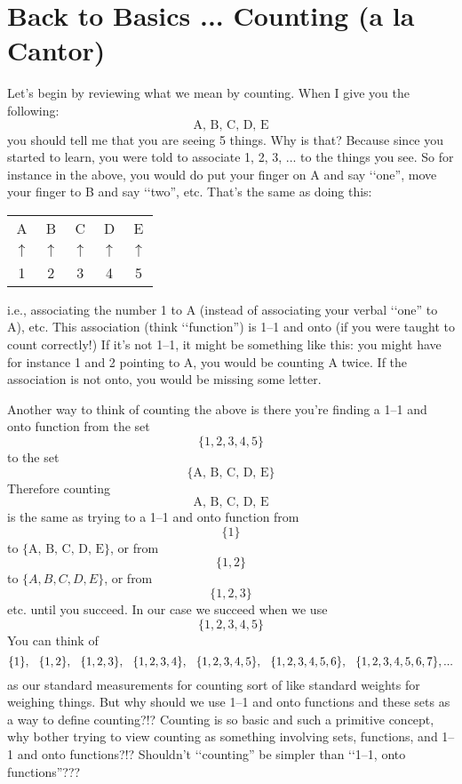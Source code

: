 \section{Back to Basics ... Counting (a la Cantor)}

Let's begin by reviewing what we mean by counting.
When I give you the following:
\[
\text{A, B, C, D, E}
\]
you should tell me that you are seeing 5 things.
Why is that? 
Because since you started to learn, you were told to associate
1, 2, 3, ... to the things you see.
So for instance in the above, you would do put your
finger on A and say \lq\lq one'',
move your finger to B and say \lq\lq two'', etc.
That's the same as doing this:
\begin{longtable}{ccccc}
A & B & C & D & E \\
$\uparrow$ & $\uparrow$ & 
$\uparrow$ & 
$\uparrow$ & 
$\uparrow$  \\
1 & 2 & 3 & 4 & 5
\end{longtable}
i.e., associating the number 1 to A (instead of associating your
verbal \lq\lq one'' to A), etc.
This association (think \lq\lq function'') is 1--1 and onto
(if you were taught to count correctly!)
If it's not 1--1, it might be something like this:
you might have for instance 1 and 2 pointing to A,
you would be counting A twice.
If the association is not onto, you would be missing some letter.

Another way to think of counting the above is there you're finding a
1--1 and onto function from the set 
\[
\{1, 2, 3, 4, 5\}
\]
to the set
\[
\{\text{A, B, C, D, E}\}
\]
Therefore counting
\[
\text{A, B, C, D, E}
\]
is the same as trying to a 1--1 and onto function from 
\[
\{1\}
\]
to $\{\text{A, B, C, D, E}\}$, or from 
\[
\{1, 2\}
\]
to $\{A, B, C, D, E\}$, or from 
\[
\{1, 2, 3\}
\] 
etc. until you succeed.
In our case we succeed when we use 
\[
\{1, 2, 3, 4, 5\}
\]
You can think of 
\[
\{1\}, \hspace{0.25cm}
\{1,2\}, \hspace{0.25cm}
\{1,2,3\}, \hspace{0.25cm}
\{1,2,3,4\}, \hspace{0.25cm}
\{1,2,3,4,5\}, \hspace{0.25cm}
\{1,2,3,4,5,6\}, \hspace{0.25cm}
\{1,2,3,4,5,6,7\}, ... 
\]
as our standard measurements for counting
sort of like standard weights for weighing things.
But why should we use 1--1 and onto functions and these sets as
a way to define counting?!?
Counting is so basic and such a primitive concept, why
bother trying to view counting as something involving sets, functions,
and 1--1 and onto functions?!?
Shouldn't \lq\lq counting'' be simpler than \lq\lq 1--1, onto functions''???

